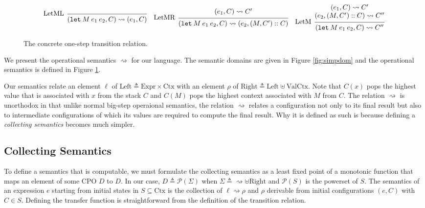 \documentclass{article}
\theoremstyle{definition}
\newcommand*{\cons}{::}
\newcommand*{\pset}{\mathscr{P}}
\newcommand*{\Expr}{\text{Expr}}
\newcommand*{\Ctx}{\text{Ctx}}
\newcommand*{\Value}{\text{Val}}
\newcommand*{\Left}{\text{Left}}
\newcommand*{\Right}{\text{Right}}
\newcommand*{\semarrow}{\rightsquigarrow}
\begin{document}
\begin{figure}[h!]
  \[
    \begin{prooftree}
      \infer[left label=LetML]0{
      (\mathtt{let}\:M\:e_{1}\:e_{2}, C)
      \semarrow
      (e_{1}, C)
      }
    \end{prooftree}\quad
    \begin{prooftree}
      \hypo{
        \begin{matrix}
          (e_{1}, C)
          \semarrow
          C'
        \end{matrix}
      }
      \infer[left label=LetMR]1{
      (\mathtt{let}\:M\:e_{1}\:e_{2}, C)
      \semarrow
      (e_{2}, (M, C')\cons C)
      }
    \end{prooftree}\quad
    \begin{prooftree}
      \hypo{
        \begin{matrix}
          (e_{1}, C)
          \semarrow
          C' \\
          (e_{2}, (M, C')\cons C)
          \semarrow
          C''
        \end{matrix}
      }
      \infer[left label=LetM]1{
      (\mathtt{let}\:M\:e_{1}\:e_{2}, C)
      \semarrow
      C''
      }
    \end{prooftree}
  \]
  \caption{The concrete one-step transition relation.}
  \label{fig:simpreach}
\end{figure}
We present the operational semantics $\semarrow$ for our language.
The semantic domains are given in Figure \ref{fig:simpdom} and the operational semantics is defined in Figure \ref{fig:simpreach}.

Our semantics relate an element $\ell$ of $\Left\triangleq\Expr\times\Ctx$ with an element $\rho$ of $\Right\triangleq\Left\uplus\Value\Ctx$.
Note that $C(x)$ pops the highest value that is associated with $x$ from the stack $C$ and $C(M)$ pops the highest context associated with $M$ from $C$.
The relation $\semarrow$ is unorthodox in that unlike normal big-step operaional semantics, the relation $\semarrow$ relates a configuration not only to its final result but also to intermediate configurations of which its values are required to compute the final result.
Why it is defined as such is because defining a \emph{collecting semantics} becomes much simpler.

\subsection{Collecting Semantics}
To define a semantics that is computable, we must formulate the collecting semantics as a least fixed point of a monotonic function that maps an element of some CPO $D$ to $D$.
In our case, $D\triangleq\pset(\Sigma)$ when $\Sigma\triangleq\semarrow\uplus\Right$ and $\pset(S)$ is the powerset of $S$.
The semantics of an expression $e$ starting from initial states in $S\subseteq\Ctx$ is the collection of $\ell\semarrow\rho$ and $\rho$ derivable from initial configurations $(e,C)$ with $C\in S$.
Defining the transfer function is straightforward from the definition of the transition relation.
\end{document}
